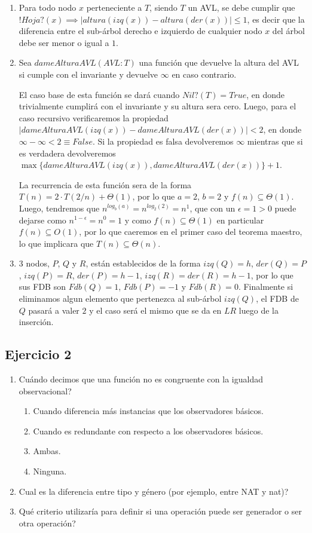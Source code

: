 \documentclass[10pt, a4paper]{article}
\begin{document}
\begin{enumerate}
 \item Para todo nodo $x$ perteneciente a $T$, siendo $T$ un AVL, se debe cumplir que $!Hoja?(x) \implies |altura(izq(x))-altura(der(x))| \leq 1$, es decir que la diferencia entre el sub-\'arbol derecho e izquierdo de cualquier nodo $x$ del \'arbol debe ser menor o igual a $1$.
 \item Sea $dameAlturaAVL(AVL: T)$ una funci\'on que devuelve la altura del AVL si cumple con el invariante y devuelve $\infty$ en caso contrario. 
 
 El caso base de esta funci\'on se dar\'a cuando $Nil?(T) = True$, en donde trivialmente cumplir\'a con el invariante y su altura sera cero. Luego, para el caso recursivo verificaremos la propiedad $|dameAlturaAVL(izq(x))-dameAlturaAVL(der(x))| < 2$, en donde $\infty - \infty < 2 \equiv False$. Si la propiedad es falsa devolveremos $\infty$ mientras que si es verdadera devolveremos $\max\{dameAlturaAVL(izq(x)),dameAlturaAVL(der(x))\}+1$.
 
 La recurrencia de esta funci\'on sera de la forma $T(n) = 2\cdot T(2/n) + \Theta(1)$, por lo que $a=2$, $b=2$ y $f(n) \subseteq \Theta(1)$. Luego, tendremos que $n^{log_b(a)} = n^{log_2(2)} = n^1$, que con un $\epsilon = 1 > 0$ puede dejarse como $n^{1-\epsilon} = n^0 = 1$ y como $f(n) \subseteq \Theta(1)$ en particular $f(n) \subseteq O(1)$, por lo que caeremos en el primer caso del teorema maestro, lo que implicara que $T(n) \subseteq \Theta(n)$.
 
 \item $3$ nodos, $P$, $Q$ y $R$, est\'an establecidos de la forma $izq(Q) = h$, $der(Q) = P$, $izq(P) = R$, $der(P) = h-1$, $izq(R) = der(R) = h-1$, por lo que sus FDB son $Fdb(Q) = 1$, $Fdb(P) = -1$ y $Fdb(R) = 0$. Finalmente si eliminamos algun elemento que pertenezca al sub-\'arbol $izq(Q)$, el FDB de $Q$ pasar\'a a valer $2$ y el caso ser\'a el mismo que se da en $LR$ luego de la inserci\'on.
\end{enumerate}


\subsection*{Ejercicio 2}

\begin{enumerate}
 \item Cu\'ando decimos que una funci\'on no es congruente con la igualdad observacional?
  \begin{enumerate}
    \item Cuando diferencia m\'as instancias que los observadores b\'asicos.
    \item Cuando es redundante con respecto a los observadores b\'asicos.
    \item Ambas.
    \item Ninguna.
  \end{enumerate}
 \item Cual es la diferencia entre tipo y g\'enero (por ejemplo, entre NAT y nat)?
 \item Qu\'e criterio utilizar\'ia para definir si una operaci\'on puede ser generador o ser otra operaci\'on?
\end{enumerate}
\end{document}
